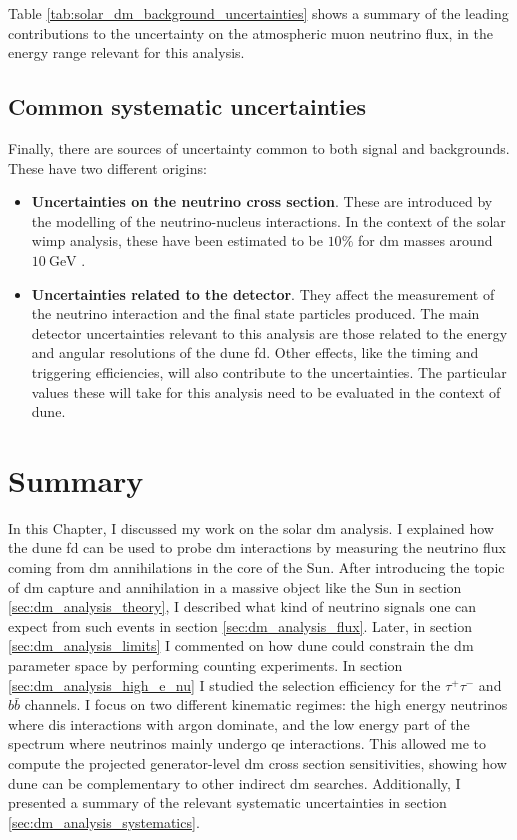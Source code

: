 Table \ref{tab:solar_dm_background_uncertainties} shows a summary of the leading contributions to the uncertainty on the atmospheric muon neutrino flux, in the energy range relevant for this analysis.

\subsection{Common systematic uncertainties}

Finally, there are sources of uncertainty common to both signal and backgrounds. These have two different origins:

\begin{itemize}
	\item \textbf{Uncertainties on the neutrino cross section}. These are introduced by the modelling of the neutrino-nucleus interactions. In the context of the solar \gls{wimp} analysis, these have been estimated to be $10\%$ for \gls{dm} masses around $10~\mathrm{GeV}$ \cite{Boliev2013}.
	\item \textbf{Uncertainties related to the detector}. They affect the measurement of the neutrino interaction and the final state particles produced. The main detector uncertainties relevant to this analysis are those related to the energy and angular resolutions of the \gls{dune} \gls{fd}. Other effects, like the timing and triggering efficiencies, will also contribute to the uncertainties. The particular values these will take for this analysis need to be evaluated in the context of \gls{dune}.
\end{itemize}

\section{Summary}

In this Chapter, I discussed my work on the solar \gls{dm} analysis. I explained how the \gls{dune} \gls{fd} can be used to probe \gls{dm} interactions by measuring the neutrino flux coming from \gls{dm} annihilations in the core of the Sun. After introducing the topic of \gls{dm} capture and annihilation in a massive object like the Sun in section \ref{sec:dm_analysis_theory}, I described what kind of neutrino signals one can expect from such events in section \ref{sec:dm_analysis_flux}. Later, in section \ref{sec:dm_analysis_limits} I commented on how \gls{dune} could constrain the \gls{dm} parameter space by performing counting experiments. In section \ref{sec:dm_analysis_high_e_nu} I studied the selection efficiency for the $\tau^{+}\tau^{-}$ and $b\bar{b}$ channels. I focus on two different kinematic regimes: the high energy neutrinos where \gls{dis} interactions with argon dominate, and the low energy part of the spectrum where neutrinos mainly undergo \gls{qe} interactions. This allowed me to compute the projected generator-level \gls{dm} cross section sensitivities, showing how \gls{dune} can be complementary to other indirect \gls{dm} searches. Additionally, I presented a summary of the relevant systematic uncertainties in section \ref{sec:dm_analysis_systematics}.

